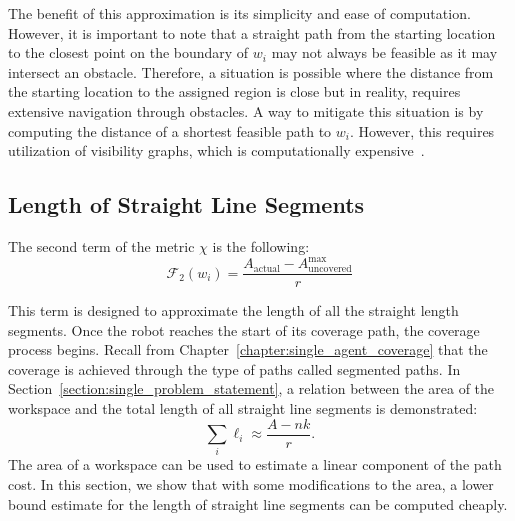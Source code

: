 \documentclass[../main.tex]{subfiles}
\begin{document}
\begin{remark}
The benefit of this approximation is its simplicity and ease of computation. However, it is important to note that a straight path from the starting location to the closest point on the boundary of $w_i$ may not always be feasible as it may intersect an obstacle. Therefore, a situation is possible where the distance from the starting location to the assigned region is close but in reality, requires extensive navigation through obstacles. A way to mitigate this situation is by computing the distance of a shortest feasible path to $w_i$. However, this requires utilization of visibility graphs, which is computationally expensive~\cite{planning-kinematics}.
\end{remark}



\subsection{Length of Straight Line Segments}
\label{subsection:sum_straight_segments}

The second term of the metric $\chi$ is the following:
\begin{equation}
	\mathcal{F}_2(w_i)=\frac{A_{\text{actual}}-A_{\text{uncovered}}^{\max}}{r}
\end{equation}

This term is designed to approximate the length of all the straight length segments. Once the robot reaches the start of its coverage path, the coverage process begins. Recall from Chapter~\ref{chapter:single_agent_coverage} that the coverage is achieved through the type of paths called segmented paths. In Section~\ref{section:single_problem_statement}, a relation between the area of the workspace and the total length of all straight line segments is demonstrated:
\begin{equation}
	\sum_i \ell_i\approx\frac{A-nk}{r}.
\end{equation}
The area of a workspace can be used to estimate a linear component of the path cost. In this section, we show that with some modifications to the area, a lower bound estimate for the length of straight line segments can be computed cheaply.
\end{document}
